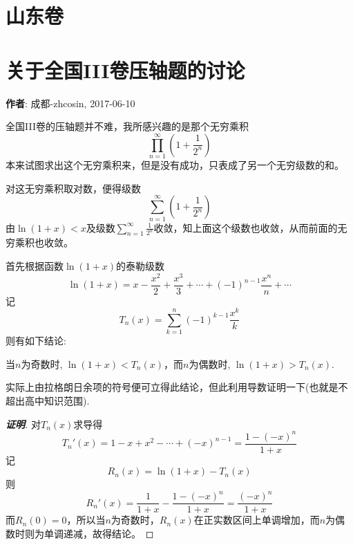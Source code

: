 \documentclass{ctexart}
\begin{document}
\section{山东卷}
\label{sec:shandong}

\newpage

\section{关于全国III卷压轴题的讨论}
\label{sec:discussion-about-nation-3-infty-product}

\textbf{作者}: 成都-zhcosin, 2017-06-10

全国III卷的压轴题并不难，我所感兴趣的是那个无穷乘积
\[ \prod_{n=1}^{\infty}\left( 1+\frac{1}{2^n} \right) \]
本来试图求出这个无穷乘积来，但是没有成功，只表成了另一个无穷级数的和。

对这无穷乘积取对数，便得级数
\[ \sum_{n=1}^{\infty} \left( 1+\frac{1}{2^n} \right) \]
由$\ln(1+x)<x$及级数$\sum_{n=1}^{\infty} \frac{1}{2^n}$收敛，知上面这个级数也收敛，从而前面的无穷乘积也收敛。

首先根据函数$\ln{(1+x)}$的泰勒级数
\[ \ln{(1+x)} = x-\frac{x^2}{2}+\frac{x^3}{3}+\cdots + (-1)^{n-1} \frac{x^n}{n}  + \cdots \]
记
\[ T_n(x) = \sum_{k=1}^n (-1)^{k-1}\frac{x^k}{k} \]
则有如下结论:
\begin{statement}
  当$n$为奇数时, $\ln{(1+x)} < T_n(x)$，而$n$为偶数时, $\ln{(1+x)}>T_n(x)$.
\end{statement}
实际上由拉格朗日余项的符号便可立得此结论，但此利用导数证明一下(也就是不超出高中知识范围).
\begin{proof}[\textbf{证明}]
  对$T_n(x)$求导得
  \[ T_n'(x) = 1-x+x^2-\cdots + (-x)^{n-1} = \frac{1-(-x)^n}{1+x} \]
  记
  \[ R_n(x) = \ln{(1+x)}-T_n(x) \]
  则
  \[ R_n'(x) = \frac{1}{1+x} - \frac{1-(-x)^n}{1+x} = \frac{(-x)^n}{1+x} \]
  而$R_n(0)=0$，所以当$n$为奇数时，$R_n(x)$在正实数区间上单调增加，而$n$为偶数时则为单调递减，故得结论。
\end{proof}
\end{document}
